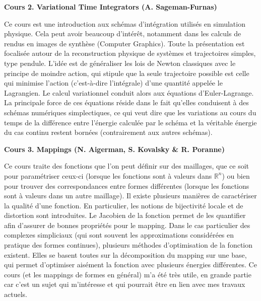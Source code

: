 \documentclass[a4paper, 11pt]{article}
\begin{document}
\begin{center} \textbf{Cours 2. Variational Time Integrators (A. Sageman-Furnas)} \end{center}

Ce cours est une introduction aux sch\'emas d'int\'egration utilis\'es en simulation physique. Cela peut avoir beaucoup d'int\'er\^et,
notamment dans les calculs de rendus en images de synth\`ese (Computer Graphics). Toute la pr\'esentation est focalis\'ee autour
de la reconstruction physique de syst\`emes et trajectoires simples, type pendule. L'id\'ee est de g\'en\'eraliser les lois de
Newton classiques avec le principe de moindre action, qui stipule que la seule trajectoire possible est celle qui minimise l'action
(c'est-\`a-dire l'int\'egrale) d'une quantit\'e appel\'ee le Lagrangien. Le calcul variationnel conduit alors aux \'equations d'Euler-Lagrange.
La principale force de ces \'equations r\'eside dans le fait qu'elles conduisent \`a des sch\'emas num\'eriques simplectiques, ce qui veut dire que 
les variations au cours du temps de la diff\'erence entre l'\'energie calcul\'ee par le sch\'ema et la v\'eritable \'energie du cas continu restent born\'ees
(contrairement aux autres sch\'emas).

\begin{center} \textbf{Cours 3. Mappings (N. Aigerman, S. Kovalsky \& R. Poranne)} \end{center}

Ce cours traite des fonctions que l'on peut d\'efinir sur des maillages, que ce soit pour param\'etriser ceux-ci (lorsque les fonctions sont \`a valeurs dans
$\mathbb{R}^n$) ou bien pour trouver des correspondances entre formes diff\'erentes (lorsque les fonctions sont \`a valeurs dans un autre maillage).
Il existe plusieurs mani\`eres de caract\'eriser la qualit\'e d'une fonction. En particulier, les notions de bijectivit\'e locale et de distortion sont
introduites. Le Jacobien de la fonction permet de les quantifier afin d'assurer de bonnes propri\'et\'es pour le mapping.
Dans le cas particulier des complexes simpliciaux (qui sont souvent les approximations consid\'er\'ees en pratique des formes continues),
plusieurs m\'ethodes d'optimisation de la fonction existent. Elles se basent toutes sur la d\'ecomposition du mapping sur une base,
qui permet d'optimiser ais\'ement la fonction avec plusieurs \'energies diff\'erentes. Ce cours (et les mappings de formes en g\'en\'eral) m'a \'et\'e tr\`es utile,
en grande partie car c'est un sujet qui m'int\'eresse et qui pourrait \^etre en lien avec mes travaux actuels.
\end{document}
